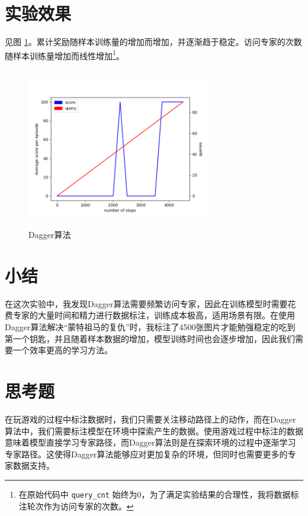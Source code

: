 \documentclass[a4paper,12pt]{article}
\begin{document}
\begin{CJK}{UTF8}{gbsn}
\section{实验效果}
见图 \ref{performance}。累计奖励随样本训练量的增加而增加，并逐渐趋于稳定。访问专家的次数随样本训练量增加而线性增加\footnote{在原始代码中 \texttt{query\_cnt} 始终为0，为了满足实验结果的合理性，我将数据标注轮次作为访问专家的次数。}。
\begin{figure}[h!]
\centering
\includegraphics[width=8cm,height=7cm]{./code/performance.png}
\caption{Dagger算法}
\label{performance}
\end{figure}
\section{小结}
在这次实验中，我发现Dagger算法需要频繁访问专家，因此在训练模型时需要花费专家的大量时间和精力进行数据标注，训练成本极高，适用场景有限。在使用Dagger算法解决“蒙特祖马的复仇”时，我标注了4500张图片才能勉强稳定的吃到第一个钥匙，并且随着样本数据的增加，模型训练时间也会逐步增加，因此我们需要一个效率更高的学习方法。
\section{思考题}
在玩游戏的过程中标注数据时，我们只需要关注移动路径上的动作，而在Dagger算法中，我们需要标注模型在环境中探索产生的数据。使用游戏过程中标注的数据意味着模型直接学习专家路径，而Dagger算法则是在探索环境的过程中逐渐学习专家路径。这使得Dagger算法能够应对更加复杂的环境，但同时也需要更多的专家数据支持。

\end{CJK}
\end{document}
